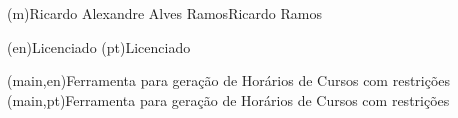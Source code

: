 
%



\ncauthorname(m){Ricardo Alexandre Alves Ramos}{Ricardo Ramos}


\ncauthordegree(en){Licenciado} 
\ncauthordegree(pt){Licenciado}




\nctitle(main,en){Ferramenta para geração de Horários de Cursos com restrições}%
\nctitle(main,pt){Ferramenta para geração de Horários de Cursos com restrições}%

